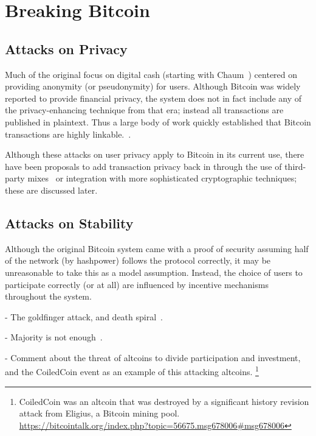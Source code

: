 \section{Breaking Bitcoin}

\subsection{Attacks on Privacy}

Much of the original focus on digital cash (starting with Chaum~\cite{chaum1982blind}) centered on providing anonymity (or pseudonymity) for users.
Although Bitcoin was widely reported to provide financial privacy, the system does not in fact include any of the privacy-enhancing technique from that era; instead all transactions are published in plaintext.
Thus a large body of work quickly established that Bitcoin transactions are highly linkable.~\cite{reid2013analysis}.

Although these attacks on user privacy apply to Bitcoin in its current use, there have been proposals to add transaction privacy back in through the use of third-party mixes~\cite{mixcoin} or integration with more sophisticated cryptographic techniques; these are discussed later.

\subsection{Attacks on Stability}
Although the original Bitcoin system came with a proof of security assuming half of the network (by hashpower) follows the protocol correctly, it may be unreasonable to take this as a model assumption. Instead, the choice of users to participate correctly (or at all) are influenced by incentive mechanisms throughout the system.

- The goldfinger attack, and death spiral~\cite{kroll2013bitcoin:weis}.

- Majority is not enough~\cite{eyal2013majority}.

- Comment about the threat of altcoins to divide participation and investment, and the CoiledCoin event as an example of this attacking altcoins. \footnote{CoiledCoin was an altcoin that was destroyed by a significant history revision attack from Eligius, a Bitcoin mining pool. \url{https://bitcointalk.org/index.php?topic=56675.msg678006\#msg678006}}
